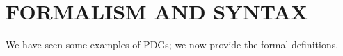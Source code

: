 \documentclass{article}
\newcommand{\commentout}[1]{\ignorespaces}
\newcommand{\bmu}{\boldsymbol{\mu}}
\newcommand{\V}{\mathcal V}
\newcommand{\N}{\mathcal N}
\newcommand{\Ed}{\mathcal E}
\newcommand{\MN}{PDG}
\newcommand{\MNs}{\MN s}
\numberwithin{equation}{section}
\begin{document}
	
	
	\section{FORMALISM AND SYNTAX}\label{sec:formal+syntax}
	
	We have seen some examples of \MNs; we now provide the formal definitions.
	\commentout{Compared to a Bayesian Network, a \MN\ still consists of a directed graph, and the edges still inform conditional probability tables, but now each edge is interpreted individually. Consider the graph
	\[ A \!\rightarrow\! C \!\leftarrow\! B,\]
	which would be interpreted as three tables $\Pr(C\mid A, B), \Pr(A), \Pr(B)$ in a BN. Interpreting it as a \MNs, there are no distributions on $A$ or $B$, and the arrows into $C$ would be split into two separate tables $\Pr(C \mid A)$ and $\Pr(B \mid A)$, rather than a joint one. }

	\def\mnvars[#1]{(\N#1, \Ed#1, \V#1, \bmu#1)}
	
\end{document}
